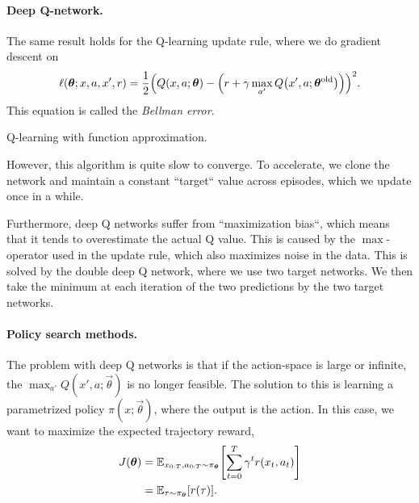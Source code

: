 \paragraph{Deep Q-network.}

The same result
holds for the Q-learning update rule, where we do gradient descent on \[
  \ell(\vec{\theta}; x,a,x',r) = \frac{1}{2} \lft( Q(x,a;\vec{\theta}) - \lft(r + \gamma \max_{a'} Q\lft(x',a; \vec{\theta}^{\mathrm{old}}\rgt) \rgt) \rgt)^2.
\]
This equation is called the \textit{Bellman error}.

\begin{algorithm}
  \begin{algorithmic}
      \EndWhile
    \EndFunction
  \end{algorithmic}
  \caption{Q-learning with function approximation.}
\end{algorithm}

However, this algorithm is quite slow to converge. To accelerate, we clone the
network and maintain a constant ``target`` value across episodes, which we
update once in a while.

Furthermore, deep Q networks suffer from ``maximization bias``, which means that
it tends to overestimate the actual Q value. This is caused by the
$\max$-operator used in the update rule, which also maximizes noise in the data.
This is solved by the double deep Q network, where we use two target networks.
We then take the minimum at each iteration of the two predictions by the two
target networks.

\paragraph{Policy search methods.}

The problem with deep Q networks is that if the action-space is large or
infinite, the $\max_{a'} Q(x',a;\vec{\theta})$ is no longer feasible. The
solution to this is learning a parametrized policy $\pi(x;\vec{\theta})$, where
the output is the action. In this case, we want to maximize the expected
trajectory reward,
\begin{align*}
  J(\vec{\theta}) &= \E_{x_{0:T},a_{0:T} \sim \pi_{\vec{\theta}}} \lft[ \sum_{t=0}^T \gamma^t r(x_t,a_t) \rgt] \\
                  &= \E_{\tau \sim \pi_{\vec{\theta}}} \lft[ r(\tau) \rgt].
\end{align*}

